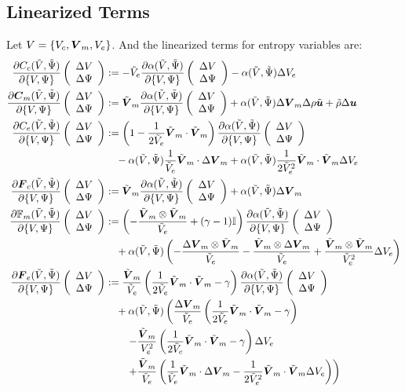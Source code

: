 \documentclass[Dissertation.tex]{subfiles}
\begin{document}
\subsection{Linearized Terms}
Let $V=\left\{ V_c,\boldsymbol V_m,V_e \right\}$.
And the linearized terms for entropy variables are:
\begin{align*}
\frac{\partial C_c(\tilde V,\tilde\Psi)}{\partial\{V,\Psi\}}\left( \begin{array}{c} \Delta V\\ \Delta\Psi\\ \end{array} \right)&:=
	-\tilde V_e\frac{\partial\alpha(\tilde V,\tilde\Psi)}{\partial\{V,\Psi\}}\left( \begin{array}{c} \Delta V\\ \Delta\Psi\\ \end{array} \right)-\alpha(\tilde V,\tilde\Psi)\Delta V_e
	\\
\frac{\partial\boldsymbol C_m(\tilde V,\tilde\Psi)}{\partial\{V,\Psi\}}\left( \begin{array}{c} \Delta V\\ \Delta\Psi\\ \end{array} \right)&:=
	\tilde{\boldsymbol V}_m\frac{\partial\alpha(\tilde V,\tilde\Psi)}{\partial\{V,\Psi\}}\left( \begin{array}{c} \Delta V\\ \Delta\Psi\\ \end{array} \right)+\alpha(\tilde V,\tilde\Psi)\Delta\boldsymbol V_m
	\Delta\rho\tilde{\boldsymbol u}+\tilde\rho\Delta\boldsymbol u
	\\
\frac{\partial C_e(\tilde V,\tilde\Psi)}{\partial\{V,\Psi\}}\left( \begin{array}{c} \Delta V\\ \Delta\Psi\\ \end{array} \right)&:=
	\left( 1-\frac{1}{2\tilde V_e}\tilde{\boldsymbol V}_m\cdot\tilde{\boldsymbol V}_m \right)\frac{\partial\alpha(\tilde V,\tilde\Psi)}{\partial\{V,\Psi\}}\left( \begin{array}{c} \Delta V\\ \Delta\Psi\\ \end{array} \right)
	\\&\quad
	-\alpha(\tilde V,\tilde\Psi)\frac{1}{\tilde V_e}\tilde{\boldsymbol V}_m\cdot\Delta\boldsymbol V_m
	+\alpha(\tilde V,\tilde\Psi)\frac{1}{2\tilde V_e^2}\tilde{\boldsymbol V}_m\cdot\tilde{\boldsymbol V}_m\Delta V_e
	\\
\frac{\partial\boldsymbol F_c(\tilde V,\tilde\Psi)}{\partial\{V,\Psi\}}\left( \begin{array}{c} \Delta V\\ \Delta\Psi\\ \end{array} \right)&:=
	\tilde{\boldsymbol V}_m\frac{\partial\alpha(\tilde V,\tilde\Psi)}{\partial\{V,\Psi\}}\left( \begin{array}{c} \Delta V\\ \Delta\Psi\\ \end{array} \right)+\alpha(\tilde V,\tilde\Psi)\Delta\boldsymbol V_m
	\\
\frac{\partial\mathbb{F}_m(\tilde V,\tilde\Psi)}{\partial\{V,\Psi\}}\left( \begin{array}{c} \Delta V\\ \Delta\Psi\\ \end{array} \right)&:=
	\left( -\frac{\tilde{\boldsymbol V}_m\otimes\tilde{\boldsymbol V}_m}{\tilde V_e}+(\gamma-1)\mathbb{I} \right)\frac{\partial\alpha(\tilde V,\tilde\Psi)}{\partial\{V,\Psi\}}\left( \begin{array}{c} \Delta V\\ \Delta\Psi\\ \end{array} \right)
	\\&\quad
	+\alpha(\tilde V,\tilde\Psi)\left( 
	-\frac{\Delta\boldsymbol V_m\otimes\tilde{\boldsymbol V}_m}{\tilde V_e}
	-\frac{\tilde{\boldsymbol V}_m\otimes\Delta\boldsymbol V_m}{\tilde V_e}
	+\frac{\tilde{\boldsymbol V}_m\otimes\tilde{\boldsymbol V}_m}{\tilde V_e^2}\Delta V_e
	 \right)
	\\
\frac{\partial\boldsymbol F_e(\tilde V,\tilde\Psi)}{\partial\{V,\Psi\}}\left( \begin{array}{c} \Delta V\\ \Delta\Psi\\ \end{array} \right)&:=
	\frac{\tilde{\boldsymbol V}_m}{\tilde V_e}
	\left( \frac{1}{2\tilde V_e}\tilde{\boldsymbol V}_m\cdot\tilde{\boldsymbol V}_m-\gamma \right)\frac{\partial\alpha(\tilde V,\tilde\Psi)}{\partial\{V,\Psi\}}\left( \begin{array}{c} \Delta V\\ \Delta\Psi\\ \end{array} \right)
	\\&\quad
	+\alpha(\tilde V,\tilde\Psi)\left(
	\frac{\Delta\boldsymbol V_m}{\tilde V_e}\left( \frac{1}{2\tilde V_e}\tilde{\boldsymbol V}_m\cdot\tilde{\boldsymbol V}_m-\gamma \right)
	\right.\\&\quad\quad\left.
	-\frac{\tilde{\boldsymbol V}_m}{V_e^2}\left( \frac{1}{2\tilde V_e}\tilde{\boldsymbol V}_m\cdot\tilde{\boldsymbol V}_m-\gamma \right)\Delta V_e
	\right.\\&\quad\quad\left.
	+\frac{\tilde{\boldsymbol V}_m}{\tilde V_e}\left( 
	\frac{1}{\tilde V_e}\tilde{\boldsymbol V}_m\cdot\Delta\boldsymbol V_m
	-\frac{1}{2\tilde V_e^2}\tilde{\boldsymbol V}_m\cdot\tilde{\boldsymbol V}_m\Delta V_e
	 \right)
	\right)
	\\
\end{align*}
\end{document}
